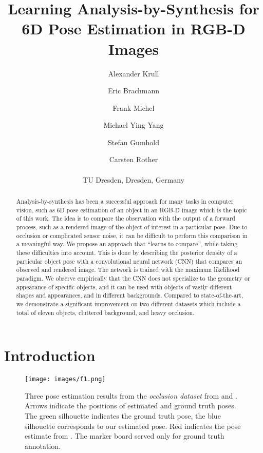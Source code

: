 \documentclass[10pt,letterpaper]{article}
\begin{document}
\title{Learning Analysis-by-Synthesis for 6D Pose Estimation in RGB-D Images}

\author{Alexander Krull\\
\and
Eric Brachmann\\
\and
Frank  Michel\\
\and
Michael Ying  Yang\\
\and
Stefan  Gumhold\\
\and
Carsten  Rother\\
\\
TU Dresden,
Dresden, Germany\\
}

\maketitle

\begin{abstract}
Analysis-by-synthesis has been a successful approach for many tasks in computer vision, such as 6D pose estimation of an object in an RGB-D image which is the topic of this work. The idea is to compare the observation with the output of a forward process, such as a rendered image of the object of interest in a particular pose. Due to occlusion or complicated sensor noise, it can be difficult to perform this comparison in a meaningful way. We propose an approach that ``learns to compare'', while taking these difficulties into account. This is done by describing the posterior density of a particular object pose with a convolutional neural network (CNN) that compares an observed and rendered image. The network is trained with the maximum likelihood paradigm. We observe empirically that the CNN does not specialize to the geometry or appearance of specific objects, and it can be used with objects of vastly different shapes and appearances, and in different backgrounds. Compared to state-of-the-art, we demonstrate a significant improvement on two different datasets which include a total of eleven objects, cluttered background, and heavy occlusion.
\end{abstract}

\section{Introduction}


\begin{figure}[!ht]
\begin{center}

\texttt{[image: images/f1.png]}
\end{center}
   \caption{Three pose estimation results from the \emph{occlusion dataset} from \cite{brachmann2014} and \cite{hinterstoisser2012accv}. Arrows indicate the positions of estimated and ground truth poses. The green silhouette indicates the ground truth pose, the blue silhouette corresponds to our estimated pose. Red indicates the pose estimate from \cite{brachmann2014}. The marker board served only for ground truth annotation.}
\label{fig:pose-result}
\end{figure}
\end{document}
